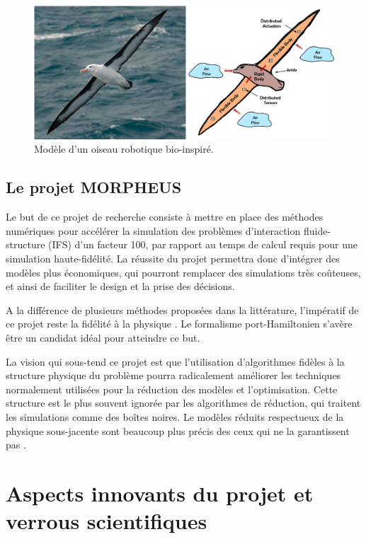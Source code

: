 \documentclass[french]{article}
\begin{document}
\begin{figure}[tb]
	\centering
	\includegraphics[width = .7\textwidth]{Bird_Port_Hamiltonian_Subsystems_FULL_ARC.eps}
	\caption{Modèle d'un oiseau robotique bio-inspiré.}
	\label{fig:pH_view_bird}
\end{figure}

\subsection{Le projet MORPHEUS}
Le but de ce projet de recherche consiste à mettre en place des méthodes numériques
pour accélérer la simulation des problèmes d'interaction fluide-structure (IFS)  d’un facteur 100, par rapport au temps de calcul requis pour une simulation haute-fidélité. La réussite du projet permettra donc d’intégrer des modèles plus économiques, qui pourront remplacer des simulations très coûteuses, et ainsi de faciliter le design et la prise des décisions.

A la différence de plusieurs méthodes proposées dans la littérature, l'impératif de ce projet reste la fidélité à la physique \cite{willcox2021}. Le formalisme port-Hamiltonien s'avère être un candidat idéal pour atteindre ce but.

La vision qui sous-tend ce projet est que l’utilisation d’algorithmes fidèles à la structure physique du problème pourra radicalement améliorer les techniques normalement utilisées pour la réduction des modèles et l’optimisation. Cette structure est le plus souvent ignorée par les algorithmes de réduction, qui traitent les simulations comme des boîtes noires. Le modèles réduits respectueux de la physique sous-jacente sont beaucoup plus précis des ceux qui ne la garantissent pas \cite{lee2020}. 


\section{Aspects innovants du projet et verrous scientifiques}
\end{document}
